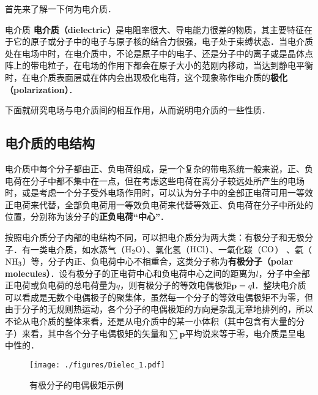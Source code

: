 
首先来了解一下何为电介质．
\begin{definition}{电介质}
\textbf{电介质（dielectric）}是电阻率很大、导电能力很差的物质，其主要特征在于它的原子或分子中的电子与原子核的结合力很强，电子处于束缚状态．当电介质处在电场中时，在电介质中，不论是原子中的电子、还是分子中的离子或是晶体点阵上的带电粒子，在电场的作用下都会在原子大小的范刚内移动，当达到静电平衡时，在电介质表面层或在体内会出现极化电荷，这个现象称作电介质的\textbf{极化（polarization）}．
\end{definition}
下面就研究电场与电介质间的相互作用，从而说明电介质的一些性质．

\subsection{电介质的电结构}

电介质中每个分子都由正、负电荷组成，是一个复杂的带电系统一般来说，正、负电荷在分子中都不集中在一点，但在考虑这些电荷在离分子较远处所产生的电场时，或是考虑一个分子受外电场作用时，可以认为分子中的全部正电荷可用一等效正电荷来代替，全部负电荷用一等效负电荷来代替等效正、负电荷在分子中所处的位置，分别称为该分子的\textbf{正负电荷“中心”}．

按照电介质分子内部的电结构不同，可以把电介质分为两大类：有极分子和无极分子．有一类电介质，如水蒸气（$\rm H_2O$）、氯化氢（$\rm HCl$）、一氧化碳（$\rm CO$） 、氨（$\rm NH_3$）等，分子内正、负电荷中心不相重合，这类分子称为\textbf{有极分子（polar molecules）}．设有极分子的正电荷中心和负电荷中心之间的距离为$l$，分子中全部正电荷或负电荷的总电荷量为$q$，则有极分子的等效电偶极矩$\mathbf p=q\mathbf l$．整块电介质可以看成是无数个电偶极子的聚集体，虽然每一个分子的等效电偶极矩不为零，但由于分子的无规则热运动，各个分子的电偶极矩的方向是杂乱无章地排列的，所以不论从电介质的整体来看，还是从电介质中的某一小体积（其中包含有大量的分子）来看，其中各个分子电偶极矩的矢量和$\sum \mathbf p$平均说来等于零，电介质是呈电中性的．
\begin{figure}[ht]
\centering
\texttt{[image: ./figures/Dielec\_1.pdf]}
\caption{有极分子的电偶极矩示例} \label{Dielec_fig1}
\end{figure}